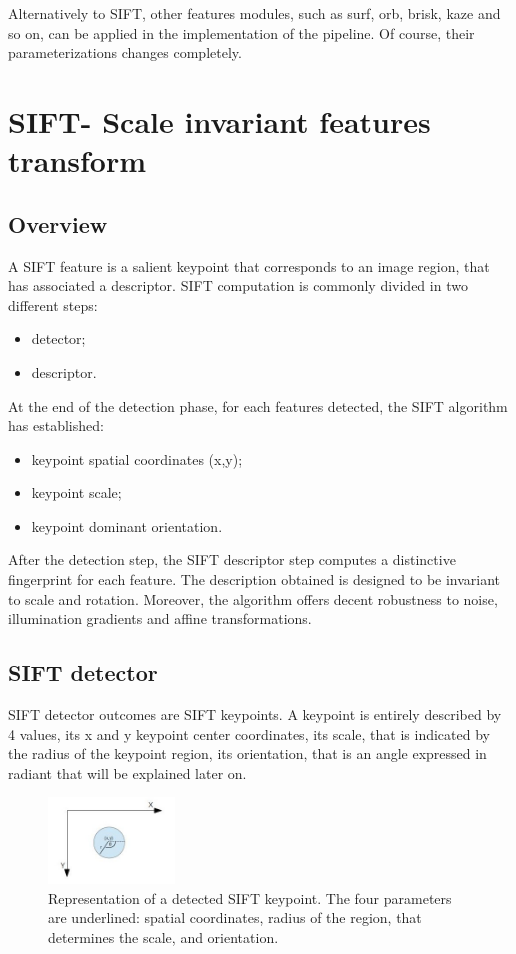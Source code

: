 \documentclass[aps,letterpaper,10pt]{revtex4}
\begin{document}
Alternatively to SIFT, other features modules, such as surf, orb, brisk, kaze and so on, can be applied in the implementation of the pipeline. Of course, their parameterizations changes completely.

\section{SIFT- Scale invariant features transform}
\subsection{Overview}
A SIFT feature is a salient keypoint that corresponds to an image region, that has associated a descriptor. SIFT computation is commonly divided in two different steps:
\begin{itemize}
\item detector;
\item descriptor.
\end{itemize}
At the end of the detection phase, for each features detected, the SIFT algorithm has established:
\begin{itemize}
\item keypoint spatial coordinates (x,y);
\item keypoint scale;
\item keypoint dominant orientation.  
\end{itemize}
After the detection step, the SIFT descriptor step computes a distinctive fingerprint for each feature. The description obtained is designed to be invariant to scale and rotation. Moreover, the algorithm offers decent robustness to noise, illumination gradients and affine transformations.
\subsection{SIFT detector}
SIFT detector outcomes are SIFT keypoints. A keypoint is entirely described by 4 values, its x and y keypoint center coordinates, its scale, that is indicated by the radius of the keypoint region, its orientation, that is an angle expressed in radiant that will be explained later on. 

\begin{figure}[h]
	\begin{center}
		\includegraphics[width=0.3\textwidth]{imgs/detected_sift.jpg}
	\end{center}
\caption{Representation of a detected SIFT keypoint. The four parameters are underlined: spatial coordinates, radius of the region, that determines the scale, and orientation.}
\end{figure}
\end{document}
